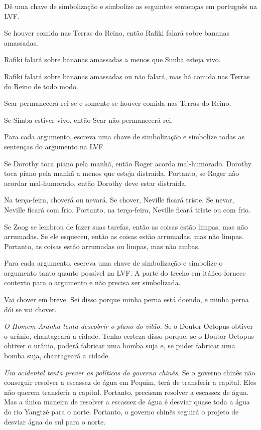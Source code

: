\solutions
\problempart Dê uma chave de simbolização e simbolize as seguintes sentenças em português na LVF.
\begin{compactlist}
\item Se houver comida nas Terras do Reino, então Rafiki falará sobre bananas amassadas.
\item Rafiki falará sobre bananas amassadas a menos que Simba esteja vivo.
\item Rafiki falará sobre bananas amassadas ou não falará, mas há comida nas Terras do Reino de todo modo.
\item Scar permanecerá rei se e somente se houver comida nas Terras do Reino.
\item Se Simba estiver vivo, então Scar não permanecerá rei.
\end{compactlist}

\problempart
Para cada argumento, escreva uma chave de simbolização e simbolize todas as sentenças do argumento na LVF.
\begin{compactlist}
\item Se Dorothy toca piano pela manhã, então Roger acorda mal-humorado. Dorothy toca piano pela manhã a menos que esteja distraída. Portanto, se Roger não acordar mal-humorado, então Dorothy deve estar distraída.
\item Na terça-feira, choverá ou nevará. Se chover, Neville ficará triste. Se nevar, Neville ficará com frio. Portanto, na terça-feira, Neville ficará triste ou com frio.
\item Se Zoog se lembrou de fazer suas tarefas, então as coisas estão limpas, mas não arrumadas. Se ele esqueceu, então as coisas estão arrumadas, mas não limpas. Portanto, as coisas estão arrumadas ou limpas, mas não ambas.
\end{compactlist}

\problempart
Para cada argumento, escreva uma chave de simbolização e simbolize o argumento tanto quanto possível na LVF. A parte do trecho em itálico fornece contexto para o argumento e não precisa ser simbolizada.
\begin{compactlist}
\item Vai chover em breve. Sei disso porque minha perna está doendo, e minha perna dói se vai chover.

\item  \emph{O Homem-Aranha tenta descobrir o plano do vilão.} Se o Doutor Octopus obtiver o urânio, chantageará a cidade. Tenho certeza disso porque, se o Doutor Octopus obtiver o urânio, poderá fabricar uma bomba suja e, se puder fabricar uma bomba suja, chantageará a cidade.

\item \emph{Um ocidental tenta prever as políticas do governo chinês.} Se o governo chinês não conseguir resolver a escassez de água em Pequim, terá de transferir a capital. Eles não querem transferir a capital. Portanto, precisam resolver a escassez de água. Mas a única maneira de resolver a escassez de água é desviar quase toda a água do rio Yangtzé para o norte. Portanto, o governo chinês seguirá o projeto de desviar água do sul para o norte.

\end{compactlist}


